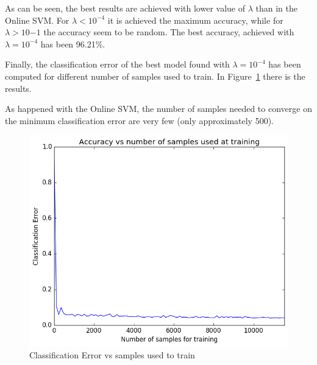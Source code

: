 \documentclass{ethz_report}
\begin{document}
As can be seen, the best results are achieved with lower value of $\lambda$ than in the Online SVM. For $\lambda < 10^{-4}$ it is achieved the maximum accuracy, while for $\lambda > 10{-1}$ the accuracy seem to be random. The best accuracy, achieved with $\lambda = 10^{-4}$ has been 96.21\%.

Finally, the classification error of the best model found with $\lambda=10^{-4}$ has been computed for different number of samples used to train. In Figure~\ref{fig:ce_vs_samples_logistic} there is the results.

As happened with the Online SVM, the number of samples needed to converge on the minimum classification error are very few (only approximately 500).

\begin{figure}[H]
\centering
\includegraphics[width=.85\linewidth]{./img/acc_vs_samples_logistic.png}
\caption{Classification Error vs samples used to train}
\label{fig:ce_vs_samples_logistic}
\end{figure}
\end{document}
